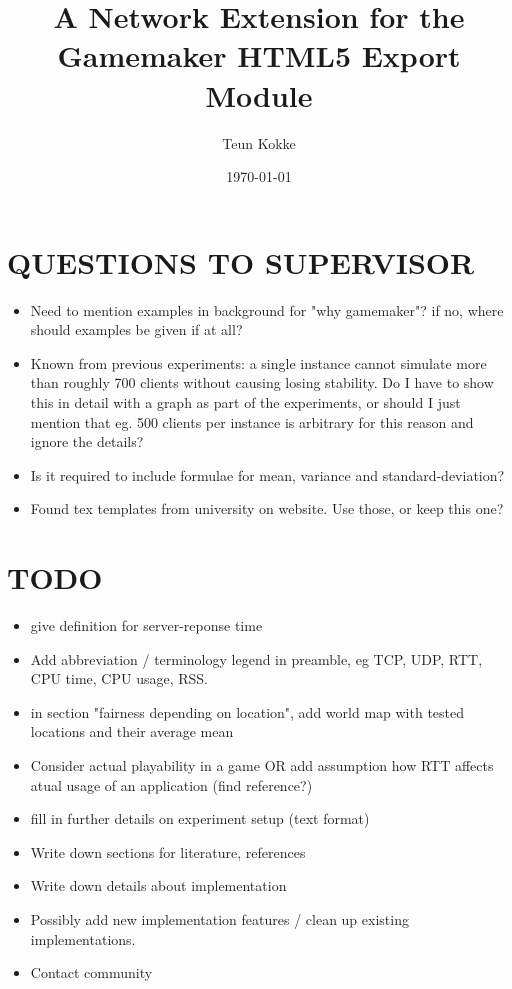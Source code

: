 \documentclass[bsc,frontabs,twoside,singlespacing,parskip,deptreport]{infthesis}     %
\begin{document}
\title{A Network Extension for the Gamemaker HTML5 Export Module}

\author{Teun Kokke}

\date{\today}


\maketitle

\section*{QUESTIONS TO SUPERVISOR}
\begin{itemize}
\item Need to mention examples in background for "why gamemaker"? if no, where should examples be given if at all?
\item Known from previous experiments: a single instance cannot simulate more than roughly 700 clients without causing losing stability. Do I have to show this in detail with a graph as part of the experiments, or should I just mention that eg. 500 clients per instance is arbitrary for this reason and ignore the details?
\item Is it required to include formulae for mean, variance and standard-deviation?
\item Found tex templates from university on website. Use those, or keep this one?
\end{itemize}

\section*{TODO}
\begin{itemize}
\item give definition for server-reponse time
\item Add abbreviation / terminology legend in preamble, eg TCP, UDP, RTT, CPU time, CPU usage, RSS.
\item in section "fairness depending on location", add world map with tested locations and their average mean
\item Consider actual playability in a game OR add assumption how RTT affects atual usage of an application (find reference?)
\item fill in further details on experiment setup (text format)
\item Write down sections for literature, references
\item Write down details about implementation
\item Possibly add new implementation features / clean up existing implementations.
\item Contact community
\end{itemize}
\end{document}
